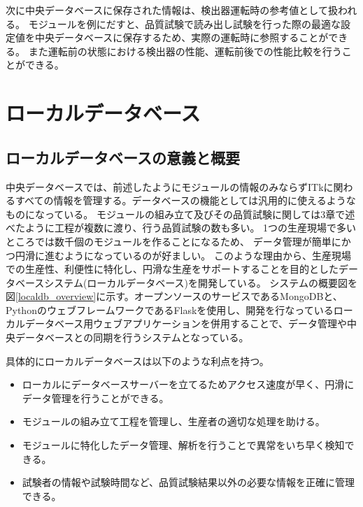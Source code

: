 次に中央データベースに保存された情報は、検出器運転時の参考値として扱われる。
モジュールを例にだすと、品質試験で読み出し試験を行った際の最適な設定値を中央データベースに保存するため、実際の運転時に参照することができる。
また運転前の状態における検出器の性能、運転前後での性能比較を行うことができる。

\clearpage
\section{ローカルデータベース}
\subsection{ローカルデータベースの意義と概要}
中央データベースでは、前述したようにモジュールの情報のみならずITkに関わるすべての情報を管理する。データベースの機能としては汎用的に使えるようなものになっている。
モジュールの組み立て及びその品質試験に関しては3章で述べたように工程が複数に渡り、行う品質試験の数も多い。
1つの生産現場で多いところでは数千個のモジュールを作ることになるため、
データ管理が簡単にかつ円滑に進むようになっているのが好ましい。
このような理由から、生産現場での生産性、利便性に特化し、円滑な生産をサポートすることを目的としたデータベースシステム(ローカルデータベース)を開発している。
システムの概要図を図\ref{localdb_overview}に示す。オープンソースのサービスであるMongoDB\cite{4-1}と、
PythonのウェブフレームワークであるFlask\cite{4-3}を使用し、開発を行なっているローカルデータベース用ウェブアプリケーションを併用することで、データ管理や中央データベースとの同期を行うシステムとなっている。

具体的にローカルデータベースは以下のような利点を持つ。

\begin{itemize}
  \item ローカルにデータベースサーバーを立てるためアクセス速度が早く、円滑にデータ管理を行うことができる。
  \item モジュールの組み立て工程を管理し、生産者の適切な処理を助ける。
  \item モジュールに特化したデータ管理、解析を行うことで異常をいち早く検知できる。
  \item 試験者の情報や試験時間など、品質試験結果以外の必要な情報を正確に管理できる。
\end{itemize}

